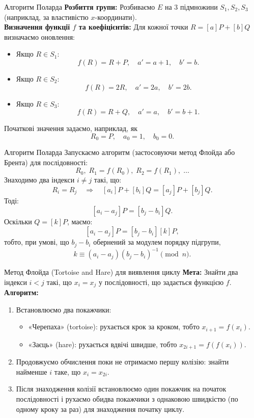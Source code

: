 \documentclass[9pt]{beamer}
\begin{document}
\begin{darkframes}
\begin{frame}{Алгоритм Поларда}
  \textbf{Розбиття групи:}  
  Розбиваємо \(E\) на 3 підмножини \(S_1, S_2, S_3\) (наприклад, за властивістю \(x\)-координати).\\[2mm]
  \textbf{Визначення функції \(f\) та коефіцієнтів:}  
  Для кожної точки \(R = [a]P+[b]Q\) визначаємо оновлення:
  \begin{itemize}
    \item Якщо \(R\in S_1\): 
      \[
      f(R)=R+P,\quad a' = a+1,\quad b' = b.
      \]
    \item Якщо \(R\in S_2\): 
      \[
      f(R)=2R,\quad a' = 2a,\quad b' = 2b.
      \]
    \item Якщо \(R\in S_3\): 
      \[
      f(R)=R+Q,\quad a' = a,\quad b' = b+1.
      \]
  \end{itemize}
  Початкові значення задаємо, наприклад, як
  \[
  R_0 = P,\quad a_0 = 1,\quad b_0 = 0.
  \]
\end{frame}

\begin{frame}{Алгоритм Поларда}
  Запускаємо алгоритм (застосовуючи метод Флойда або Брента) для послідовності:
  \[
  R_0,\; R_1=f(R_0),\; R_2=f(R_1),\; \dots
  \]
  Знаходимо два індекси \(i \neq j\) такі, що:
  \[
  R_i = R_j \quad \Longrightarrow \quad [a_i]P+[b_i]Q = [a_j]P+[b_j]Q.
  \]
  Тоді:
  \[
  [a_i-a_j]P = [b_j-b_i]Q.
  \]
  Оскільки \(Q = [k]P\), маємо:
  \[
  [a_i-a_j]P = [b_j-b_i][k]P,
  \]
  тобто, при умові, що \(b_j-b_i\) обернений за модулем порядку підгрупи,
  \[
  k \equiv (a_i - a_j)(b_j-b_i)^{-1} \pmod{n}.
  \]
\end{frame}

\begin{frame}{Метод Флойда (Tortoise and Hare) для виявлення циклу}
  \textbf{Мета:} Знайти два індекси \(i < j\) такі, що \(x_i = x_j\) у послідовності, що задається функцією \(f\).\\[2mm]
  
  \textbf{Алгоритм:}
  \begin{enumerate}
    \item Встановлюємо два покажчики:
      \begin{itemize}
        \item «Черепаха» (tortoise): рухається крок за кроком, тобто \(x_{i+1} = f(x_i)\).
        \item «Заєць» (hare): рухається вдвічі швидше, тобто \(x_{2i+1} = f(f(x_i))\).
      \end{itemize}
    \item Продовжуємо обчислення поки не отримаємо першу колізію: знайти найменше \(i\) таке, що 
      \(
      x_i = x_{2i}.
      \)
    \item Після знаходження колізії встановлюємо один покажчик на початок послідовності і рухаємо обидва покажчики з однаковою швидкістю (по одному кроку за раз) для знаходження початку циклу.
  \end{enumerate}
  

\end{frame}
\end{darkframes}
\end{document}
